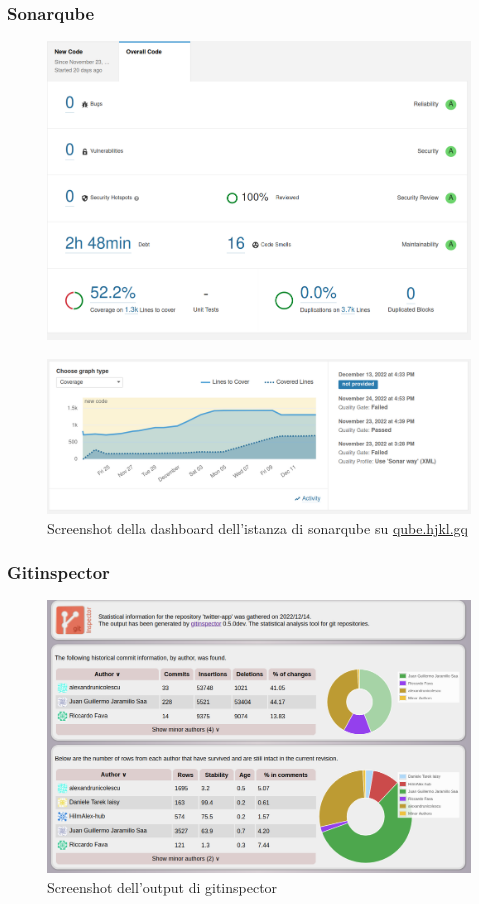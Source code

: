 \documentclass{article}
\begin{document}
\subsubsection{Sonarqube}
\begin{figure}[H]
    \centering
    \includegraphics[scale=0.30]{misc/qube_analysis.png}
    \label{fig:qubeanalysis}
\end{figure}
\begin{figure}[H]
    \centering
    \includegraphics[scale=0.30]{misc/coverage_graph.png}
    \caption{Screenshot della dashboard dell'istanza di sonarqube su \href{https://qube.hjkl.gq}{qube.hjkl.gq}}
    \label{fig:qubeanalysis}
\end{figure}
\subsubsection{Gitinspector}
\begin{figure}[H]
    \centering
    \includegraphics[scale=0.30]{misc/inspector_finale.png}
    \caption{Screenshot dell'output di gitinspector}
    \label{fig:qubeanalysis}
\end{figure}
\end{document}
